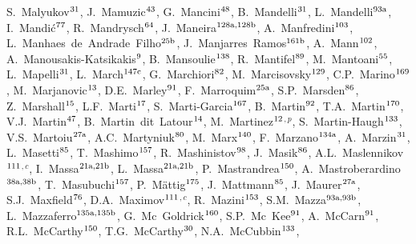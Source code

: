 \begin{flushleft}
S.~Malyukov$^\textrm{\scriptsize 31}$,
J.~Mamuzic$^\textrm{\scriptsize 43}$,
G.~Mancini$^\textrm{\scriptsize 48}$,
B.~Mandelli$^\textrm{\scriptsize 31}$,
L.~Mandelli$^\textrm{\scriptsize 93a}$,
I.~Mandi\'{c}$^\textrm{\scriptsize 77}$,
R.~Mandrysch$^\textrm{\scriptsize 64}$,
J.~Maneira$^\textrm{\scriptsize 128a,128b}$,
A.~Manfredini$^\textrm{\scriptsize 103}$,
L.~Manhaes~de~Andrade~Filho$^\textrm{\scriptsize 25b}$,
J.~Manjarres~Ramos$^\textrm{\scriptsize 161b}$,
A.~Mann$^\textrm{\scriptsize 102}$,
A.~Manousakis-Katsikakis$^\textrm{\scriptsize 9}$,
B.~Mansoulie$^\textrm{\scriptsize 138}$,
R.~Mantifel$^\textrm{\scriptsize 89}$,
M.~Mantoani$^\textrm{\scriptsize 55}$,
L.~Mapelli$^\textrm{\scriptsize 31}$,
L.~March$^\textrm{\scriptsize 147c}$,
G.~Marchiori$^\textrm{\scriptsize 82}$,
M.~Marcisovsky$^\textrm{\scriptsize 129}$,
C.P.~Marino$^\textrm{\scriptsize 169}$,
M.~Marjanovic$^\textrm{\scriptsize 13}$,
D.E.~Marley$^\textrm{\scriptsize 91}$,
F.~Marroquim$^\textrm{\scriptsize 25a}$,
S.P.~Marsden$^\textrm{\scriptsize 86}$,
Z.~Marshall$^\textrm{\scriptsize 15}$,
L.F.~Marti$^\textrm{\scriptsize 17}$,
S.~Marti-Garcia$^\textrm{\scriptsize 167}$,
B.~Martin$^\textrm{\scriptsize 92}$,
T.A.~Martin$^\textrm{\scriptsize 170}$,
V.J.~Martin$^\textrm{\scriptsize 47}$,
B.~Martin~dit~Latour$^\textrm{\scriptsize 14}$,
M.~Martinez$^\textrm{\scriptsize 12}$$^{,p}$,
S.~Martin-Haugh$^\textrm{\scriptsize 133}$,
V.S.~Martoiu$^\textrm{\scriptsize 27a}$,
A.C.~Martyniuk$^\textrm{\scriptsize 80}$,
M.~Marx$^\textrm{\scriptsize 140}$,
F.~Marzano$^\textrm{\scriptsize 134a}$,
A.~Marzin$^\textrm{\scriptsize 31}$,
L.~Masetti$^\textrm{\scriptsize 85}$,
T.~Mashimo$^\textrm{\scriptsize 157}$,
R.~Mashinistov$^\textrm{\scriptsize 98}$,
J.~Masik$^\textrm{\scriptsize 86}$,
A.L.~Maslennikov$^\textrm{\scriptsize 111}$$^{,c}$,
I.~Massa$^\textrm{\scriptsize 21a,21b}$,
L.~Massa$^\textrm{\scriptsize 21a,21b}$,
P.~Mastrandrea$^\textrm{\scriptsize 150}$,
A.~Mastroberardino$^\textrm{\scriptsize 38a,38b}$,
T.~Masubuchi$^\textrm{\scriptsize 157}$,
P.~M\"attig$^\textrm{\scriptsize 175}$,
J.~Mattmann$^\textrm{\scriptsize 85}$,
J.~Maurer$^\textrm{\scriptsize 27a}$,
S.J.~Maxfield$^\textrm{\scriptsize 76}$,
D.A.~Maximov$^\textrm{\scriptsize 111}$$^{,c}$,
R.~Mazini$^\textrm{\scriptsize 153}$,
S.M.~Mazza$^\textrm{\scriptsize 93a,93b}$,
L.~Mazzaferro$^\textrm{\scriptsize 135a,135b}$,
G.~Mc~Goldrick$^\textrm{\scriptsize 160}$,
S.P.~Mc~Kee$^\textrm{\scriptsize 91}$,
A.~McCarn$^\textrm{\scriptsize 91}$,
R.L.~McCarthy$^\textrm{\scriptsize 150}$,
T.G.~McCarthy$^\textrm{\scriptsize 30}$,
N.A.~McCubbin$^\textrm{\scriptsize 133}$,
$$
\end{flushleft}
